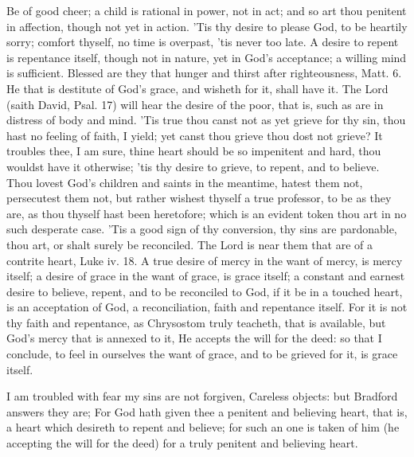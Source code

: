 {Be of good cheer; a child is rational in power, not in act; and so art
thou penitent in affection, though not yet in action. 'Tis thy desire
to please God, to be heartily sorry; comfort thyself, no time is
overpast, 'tis never too late. A desire to repent is repentance itself,
though not in nature, yet in God's acceptance; a willing mind is
sufficient. Blessed are they that hunger and thirst after
righteousness, Matt.  6. He that is destitute of God's grace, and
wisheth for it, shall have it. The Lord (saith David, Psal.  17) will
hear the desire of the poor, that is, such as are in distress of body
and mind. 'Tis true thou canst not as yet grieve for thy sin, thou hast
no feeling of faith, I yield; yet canst thou grieve thou dost not
grieve? It troubles thee, I am sure, thine heart should be so
impenitent and hard, thou wouldst have it otherwise; 'tis thy desire to
grieve, to repent, and to believe. Thou lovest God's children and
saints in the meantime, hatest them not, persecutest them not, but
rather wishest thyself a true professor, to be as they are, as thou
thyself hast been heretofore; which is an evident token thou art in no
such desperate case. 'Tis a good sign of thy conversion, thy sins are
pardonable, thou art, or shalt surely be reconciled. The Lord is near
them that are of a contrite heart, Luke iv. 18. A true desire of
mercy in the want of mercy, is mercy itself; a desire of grace in the
want of grace, is grace itself; a constant and earnest desire to
believe, repent, and to be reconciled to God, if it be in a touched
heart, is an acceptation of God, a reconciliation, faith and repentance
itself. For it is not thy faith and repentance, as Chrysostom
truly teacheth, that is available, but God's mercy that is annexed to
it, He accepts the will for the deed: so that I conclude, to feel in
ourselves the want of grace, and to be grieved for it, is grace itself.

I am troubled with fear my sins are not forgiven, Careless objects: but
Bradford answers they are; For God hath given thee a penitent and
believing heart, that is, a heart which desireth to repent and believe;
for such an one is taken of him (he accepting the will for the deed)
for a truly penitent and believing heart.

}

